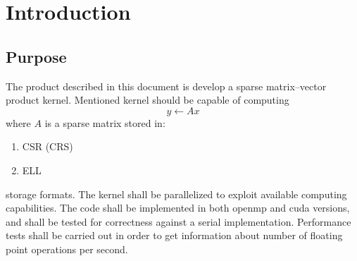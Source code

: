 
\chapter{Introduction}

\section{Purpose}
	\begin{comment}
	$<$Identify the product whose software requirements are specified in this 
	document, including the revision or release number. Describe the scope of the 
	product that is covered by this SRS, particularly if this SRS describes only 
	part of the system or a single subsystem.$>$
	\end{comment}
	The product described in this document is develop a sparse matrix--vector product kernel. Mentioned kernel should be capable of computing
	\begin{equation}
		y \leftarrow Ax
	\end{equation}
	where $A$ is a sparse matrix stored in:
	\begin{enumerate}
		\item \gls{CSR} (\gls{CRS})
		\item \gls{ELL}
	\end{enumerate}
	storage formats. The kernel shall be parallelized to exploit available computing capabilities. The code shall be implemented in both \gls{openmp} and \gls{cuda} versions, and shall be tested for correctness against a serial implementation. Performance tests shall be carried out in order to get information about number of floating point operations per second.
